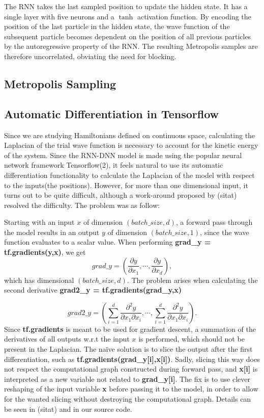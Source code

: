 The RNN takes the last sampled position to update the hidden state. It has a
single layer with five neurons and a \(\tanh\) activation function. 
By encoding the position of the last particle in the hidden state, the wave
function of the subsequent particle becomes dependent on the position of all
previous particles by the autoregressive property of the RNN. The resulting
Metropolis samples are therefore uncorrelated, obviating the need for blocking.

\subsection{Metropolis Sampling}


\subsection{Automatic Differentiation in Tensorflow}
Since we are studying Hamiltonians defined on continuous space, calculating the
Laplacian of the trial wave function is necessary to account for the kinetic
energy of the system. Since the RNN-DNN model is made using the popular neural
network framework Tensorflow(2), it feels natural to use its automatic
differentiation functionality to calculate the Laplacian of the model with
respect to the inputs(the positions). However, for more than one dimensional
input, it turns out to be quite difficult, although a work-around proposed by
(sitat) resolved the difficulty. The problem was as follow:  

Starting with an input $x$ of dimension $(batch\_size, d)$, a forward pass through the model results in an output $y$ of dimension $(batch\_size, 1)$, since the wave function evaluates to a scalar value. When performing \textbf{grad\_y = tf.gradients(y,x)}, we get 
\begin{equation*}
	grad\_y = \left(\frac{\partial y}{\partial x_1}, \cdots, \frac{\partial y}{\partial x_d}\right),
\end{equation*}
which has dimensional $(batch\_size, d)$. The problem arises when calculating the second derivative \textbf{grad2\_y = tf.gradients(grad\_y,x)}

\begin{equation*}
	grad2\_y = \left(\sum_{i=1}^{d}\frac{\partial^2 y}{\partial x_1 \partial x_i}, \cdots, \sum_{i=1}^{d}\frac{\partial^2 y}{\partial x_1 \partial x_i}\right).
\end{equation*}
Since \textbf{tf.gradients} is meant to be used for gradient descent, a summation of the derivatives of all outputs w.r.t the input $x$ is performed, which should not be present in the Laplacian.
The naïve solution is to slice the output after the first differentiation, such as\newline 
\textbf{tf.gradients(grad\_y[i],x[i])}. Sadly, slicing this way does not respect the computational graph constructed during forward pass, and \textbf{x[i]} is interpreted as a new variable not related to \textbf{grad\_y[i]}. The fix is to use clever reshaping of the input variable \textbf{x} before passing it to the model, in order to allow for the wanted slicing without destroying the computational graph. Details can be seen in (sitat) and in our source code. 

